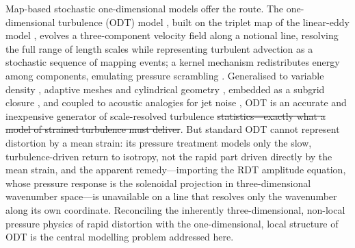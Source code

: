 \documentclass[lineno]{JFM-FLM_Au}
\providecommand{\DIFadd}[1]{{\protect\color{blue}\uwave{#1}}} %
\providecommand{\DIFdel}[1]{{\protect\color{red}\sout{#1}}} %
\providecommand{\DIFaddbegin}{} %
\providecommand{\DIFaddend}{} %
\providecommand{\DIFdelbegin}{} %
\providecommand{\DIFdelend}{} %
\begin{document}
Map-based stochastic one-dimensional models offer the route. The
one-dimensional turbulence (ODT) model
\citep{Kerstein1999,Kerstein2001}, built on the triplet map of the
linear-eddy model \citep{Kerstein1991}, evolves a three-component
velocity field along a notional line, resolving the full range of length
scales while representing turbulent advection as a stochastic sequence
of mapping events; a kernel mechanism redistributes energy among
components, emulating pressure scrambling
\citep{WunschKerstein2001,Kerstein2001}. Generalised to variable density
\citep{AshurstKerstein2005}, adaptive meshes \citep{Lignell2013,
StephensLignell2021} and cylindrical geometry \citep{Lignell2018},
embedded as a subgrid closure \citep{SchmidtKerstein2010}, and coupled
to acoustic analogies for jet noise
\citep{SharmaKleinSchmidt2022,MedinaMendez2023}, ODT is an accurate and
inexpensive generator of scale-resolved turbulence \DIFdelbegin \DIFdel{statistics---exactly
what a model of strained turbulence must deliver}\DIFdelend \DIFaddbegin \DIFadd{statistics}\DIFaddend . But standard ODT
cannot represent distortion by a mean strain: its pressure treatment
models only the slow, turbulence-driven return to isotropy, not the
rapid part driven directly by the mean strain, and the
apparent remedy---importing the RDT amplitude equation, whose pressure
response is the solenoidal projection in three-dimensional wavenumber
space---is unavailable on a line that resolves only the wavenumber along
its own coordinate. Reconciling the inherently three-dimensional,
non-local pressure physics of rapid distortion with the one-dimensional,
local structure of ODT is the central modelling problem addressed here.
\end{document}
